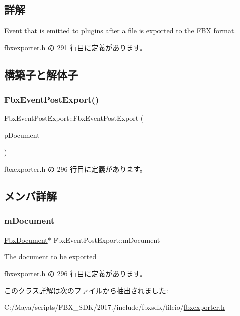\subsection{詳解}
Event that is emitted to plugins after a file is exported to the F\+BX format. 

 fbxexporter.\+h の 291 行目に定義があります。



\subsection{構築子と解体子}
\mbox{\label{class_fbx_event_post_export_ab35efa8c72530d563f35128018c9bfcc}} 
\subsubsection{\texorpdfstring{Fbx\+Event\+Post\+Export()}{FbxEventPostExport()}}
{\footnotesize\ttfamily Fbx\+Event\+Post\+Export\+::\+Fbx\+Event\+Post\+Export (\begin{DoxyParamCaption}\item[{\hyperlink{class_fbx_document}{Fbx\+Document} $\ast$}]{p\+Document }\end{DoxyParamCaption})\hspace{0.3cm}{\ttfamily [inline]}}



 fbxexporter.\+h の 296 行目に定義があります。



\subsection{メンバ詳解}
\mbox{\label{class_fbx_event_post_export_aca668d4ffcd12dc1b6455bb5165fb2f5}} 
\subsubsection{\texorpdfstring{m\+Document}{mDocument}}
{\footnotesize\ttfamily \hyperlink{class_fbx_document}{Fbx\+Document}$\ast$ Fbx\+Event\+Post\+Export\+::m\+Document}



The document to be exported 



 fbxexporter.\+h の 296 行目に定義があります。



このクラス詳解は次のファイルから抽出されました\+:\begin{DoxyCompactItemize}
\item 
C\+:/\+Maya/scripts/\+F\+B\+X\+\_\+\+S\+D\+K/2017./include/fbxsdk/fileio/\hyperlink{fbxexporter_8h}{fbxexporter.\+h}\end{DoxyCompactItemize}
